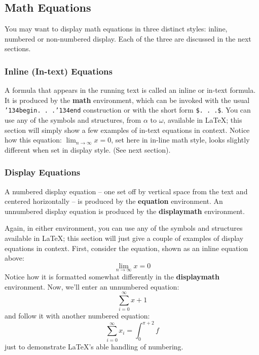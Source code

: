 \documentclass{style/nime-alternate}
\begin{document}
\subsection{Math Equations}
You may want to display math equations in three distinct styles:
inline, numbered or non-numbered display.  Each of
the three are discussed in the next sections.

\subsubsection{Inline (In-text) Equations}
A formula that appears in the running text is called an
inline or in-text formula.  It is produced by the
\textbf{math} environment, which can be
invoked with the usual \texttt{{\char'134}begin. . .{\char'134}end}
construction or with the short form \texttt{\$. . .\$}. You
can use any of the symbols and structures,
from $\alpha$ to $\omega$, available in
\LaTeX \cite{Lamport:LaTeX}; this section will simply show a
few examples of in-text equations in context. Notice how
this equation: \begin{math}\lim_{n\rightarrow \infty}x=0\end{math},
set here in in-line math style, looks slightly different when
set in display style.  (See next section).

\subsubsection{Display Equations}
A numbered display equation -- one set off by vertical space
from the text and centered horizontally -- is produced
by the \textbf{equation} environment. An unnumbered display
equation is produced by the \textbf{displaymath} environment.

Again, in either environment, you can use any of the symbols
and structures available in \LaTeX; this section will just
give a couple of examples of display equations in context.
First, consider the equation, shown as an inline equation above:
\begin{equation}\lim_{n\rightarrow \infty}x=0\end{equation}
Notice how it is formatted somewhat differently in
the \textbf{displaymath}
environment.  Now, we'll enter an unnumbered equation:
\begin{displaymath}\sum_{i=0}^{\infty} x + 1\end{displaymath}
and follow it with another numbered equation:
\begin{equation}\sum_{i=0}^{\infty}x_i=\int_{0}^{\pi+2} f\end{equation}
just to demonstrate \LaTeX's able handling of numbering.
\end{document}
